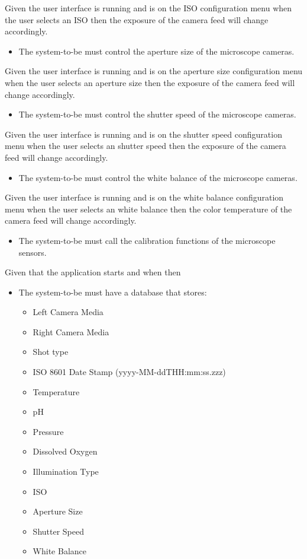 Given the user interface is running and is on the ISO configuration menu when the user selects an ISO then the exposure of the camera feed will change accordingly.
\begin{itemize}
    \item The system-to-be must control the aperture size of the microscope cameras.
\end{itemize}
Given the user interface is running and is on the aperture size configuration menu when the user selects an aperture size then the exposure of the camera feed will change accordingly.
\begin{itemize}
    \item The system-to-be must control the shutter speed of the microscope cameras.
\end{itemize}
Given the user interface is running and is on the shutter speed configuration menu when the user selects an shutter speed then the exposure of the camera feed will change accordingly.
\begin{itemize}
    \item The system-to-be must control the white balance of the microscope cameras.
\end{itemize}
Given the user interface is running and is on the white balance configuration menu when the user selects an white balance then the color temperature of the camera feed will change accordingly.
\begin{itemize}
    \item The system-to-be must call the calibration functions of the microscope sensors.
\end{itemize}
Given that the application starts and when then
\begin{itemize}
    \item The system-to-be must have a database that stores:
    \begin{itemize}
        \item Left Camera Media
        \item Right Camera Media
        \item Shot type
        \item ISO 8601 Date Stamp (yyyy-MM-ddTHH:mm:ss.zzz)
        \item Temperature
        \item pH
        \item Pressure
        \item Dissolved Oxygen
        \item Illumination Type
        \item ISO
        \item Aperture Size
        \item Shutter Speed
        \item White Balance
    \end{itemize}
\end{itemize}
